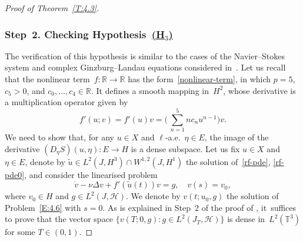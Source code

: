 \documentclass[JEP,XML,SOM,Unicode,ThmDefs]{cedram}
\let\mathcal\mathscr
\theoremstyle{plain}
\numberwithin{equation}{section}
\newcommand{\R}{{\mathbb R}}
\newcommand{\T}{{\mathbb T}}
\newcommand{\HH}{{\mathcal H}}
\begin{document}
\begin{proof}[Proof of Theorem~\ref{T:4.3}]
\subsubsection*{Step~2. Checking Hypothesis~\protect\hyperlink{H3}{\rm(H$_3$)}}
The verification of this hypothesis is similar to the cases of the Navier--Stokes system and complex Ginzburg--Landau equations considered in~\cite[\S 4]{KNS-2020}. Let us recall that the nonlinear term~$f:\R\to\R$ has the form~\eqref{nonlinear-term}, in which $p=5$, $c_5>0$, and $c_0,\dots,c_4\in\R$. It defines a smooth mapping in~$H^2$, whose derivative is a multiplication operator given by
\[
f'(u;v)=f'(u)v=\biggl(\,\sum_{n=1}^5 n c_n u^{n-1}\biggr)v.
\]
We need to show that, for any $u\in X$ and $\ell$-a.e.~$\eta\in E$, the image of the derivative $(D_\eta S)(u,\eta):E\to H$ is a dense subspace. Let us fix $u\in X$ and $\eta\in E$, denote by $\tilde u\in L^2(J,H^3)\cap W^{1,2}(J,H^1)$ the solution of~\eqref{rf-pde}, \eqref{rf-pde0}, and consider the linearised problem\vspace*{-3pt}
\begin{equation} \label{E:4.6}
\dot v-\nu \Delta v+f'(\tilde u(t))v=g, \quad v(s)=v_0,
\end{equation}
where $v_0\in H$ and $g\in L^2(J,\HH)$. We denote by $v(t;u_0,g)$ the solution of Problem~\eqref{E:4.6} with $s=0$. As is explained in Step~2 of the proof of \cite[Th.\,4.7]{KNS-2020}, it~suffices to prove that the vector space $\{v(T;0,g): g\in L^2(J_T,\HH)\}$ is dense in~$L^2(\T^3)$ for some $T\in(0,1)$.


\end{proof}
\end{document}
